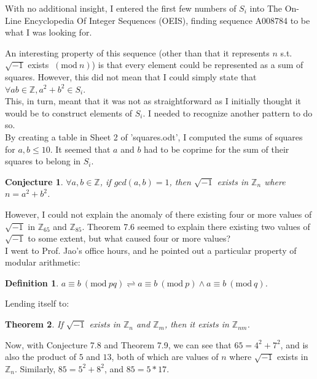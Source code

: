 \documentclass[12pt]{article}
\newcommand{\bZ}{{\mathbb{Z}}}
\newcommand{\Mod}[1]{\ (\mathrm{mod}\ #1)}
\newtheorem{theorem}{Theorem}[section]
\newtheorem{definition}{Definition}[section]
\newtheorem{conj}[theorem]{Conjecture}
\begin{document}
		With no additional insight, I entered the first few numbers of $S_i$ into The On-Line Encyclopedia Of Integer Sequences (OEIS), finding sequence A008784 to be what I was looking for.\\

\pagebreak

		An interesting property of this sequence (other than that it represents $n$ s.t. $\sqrt{-1}$ exists $\Mod{n}$) is that every element could be represented as a sum of squares. However, this did not mean that I could simply state that $\forall a b \in \bZ, a^2 + b^2 \in S_i$.\\

		This, in turn, meant that it was not as straightforward as I initially thought it would be to construct elements of $S_i$. I needed to recognize another pattern to do so.\\

		By creating a table in Sheet 2 of 'squares.odt', I computed the sums of squares for $a, b \le 10$. It seemed that $a$ and $b$ had to be coprime for the sum of their squares to belong in $S_i$.

		\begin{conj}
			$\forall a, b \in \bZ$, if $gcd(a, b)=1$, then $\sqrt{-1}$ exists in $\bZ_n$ where $n = a^2 + b^2$.
		\end{conj}

		However, I could not explain the anomaly of there existing four or more values of $\sqrt{-1}$ in $\bZ_{65}$ and $\bZ_{85}$. Theorem 7.6 seemed to explain there existing two values of $\sqrt{-1}$ to some extent, but what caused four or more values?\\

		I went to Prof. Jao's office hours, and he pointed out a particular property of modular arithmetic:

		\begin{definition}
			$a \equiv b \Mod{pq} \rightleftharpoons a \equiv b \Mod{p} \wedge a \equiv b \Mod{q}$.
		\end{definition}

		Lending itself to:

		\begin{theorem}
			If $\sqrt{-1}$ exists in $\bZ_n$ and $\bZ_m$, then it exists in $\bZ_{nm}$.
		\end{theorem}

		Now, with Conjecture 7.8 and Theorem 7.9, we can see that $65 = 4^2 + 7^2$, and is also the product of $5$ and $13$, both of which are values of $n$ where $\sqrt{-1}$ exists in $\bZ_n$. Similarly, $85 = 5^2 + 8^2$, and $85 = 5 * 17$.
\end{document}
